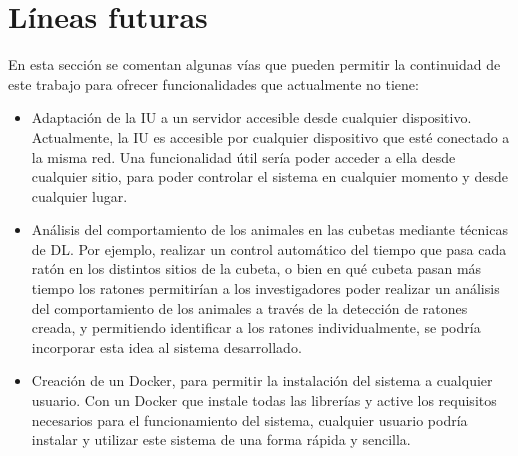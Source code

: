 \section{Líneas futuras}
En esta sección se comentan algunas vías que pueden permitir la continuidad de este trabajo para ofrecer funcionalidades que actualmente no tiene:
\begin{itemize}
\item Adaptación de la IU a un servidor accesible desde cualquier dispositivo. Actualmente, la IU es accesible por cualquier dispositivo que esté conectado a la misma red. Una funcionalidad útil sería poder acceder a ella desde cualquier sitio, para poder controlar el sistema en cualquier momento y desde cualquier lugar.
\item Análisis del comportamiento de los animales en las cubetas mediante técnicas de DL. Por ejemplo, realizar un control automático del tiempo que pasa cada ratón en los distintos sitios de la cubeta, o bien en qué cubeta pasan más tiempo los ratones permitirían a los investigadores poder realizar un análisis del comportamiento de los animales a través de la detección de ratones creada, y permitiendo identificar a los ratones individualmente, se podría incorporar esta idea al sistema desarrollado.
\item Creación de un Docker, para permitir la instalación del sistema a cualquier usuario. Con un Docker que instale todas las librerías y active los requisitos necesarios para el funcionamiento del sistema, cualquier usuario podría instalar y utilizar este sistema de una forma rápida y sencilla.
\end{itemize}



